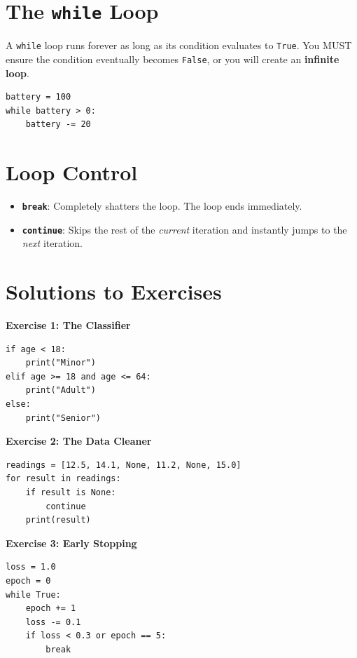 \section{The \texttt{while} Loop}
A \texttt{while} loop runs forever as long as its condition evaluates to \texttt{True}. You MUST ensure the condition eventually becomes \texttt{False}, or you will create an \textbf{infinite loop}.
\begin{lstlisting}
battery = 100
while battery > 0:
    battery -= 20 
\end{lstlisting}

\section{Loop Control}
\begin{itemize}
    \item \textbf{\texttt{break}}: Completely shatters the loop. The loop ends immediately.
    \item \textbf{\texttt{continue}}: Skips the rest of the \textit{current} iteration and instantly jumps to the \textit{next} iteration.
\end{itemize}


\section{Solutions to Exercises}

\textbf{Exercise 1: The Classifier}
\begin{lstlisting}
if age < 18:
    print("Minor")
elif age >= 18 and age <= 64:
    print("Adult")
else:
    print("Senior")
\end{lstlisting}

\vspace{1em}
\textbf{Exercise 2: The Data Cleaner}
\begin{lstlisting}
readings = [12.5, 14.1, None, 11.2, None, 15.0]
for result in readings:
    if result is None:
        continue
    print(result)
\end{lstlisting}

\vspace{1em}
\textbf{Exercise 3: Early Stopping}
\begin{lstlisting}
loss = 1.0
epoch = 0
while True:
    epoch += 1
    loss -= 0.1
    if loss < 0.3 or epoch == 5:
        break
\end{lstlisting}
